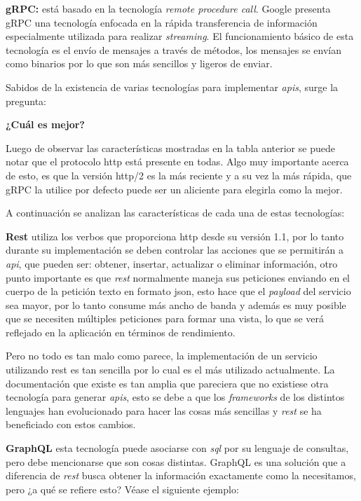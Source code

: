 \documentclass[12pt,spanish,Letterpaper,openany]{book}
\newcommand{\spacefourmilis}{\vspace{4mm}}
\newcommand{\spacetwomilis}{\vspace{2mm}}
\begin{document}

\textbf{gRPC:} está basado en la tecnología \emph{remote procedure call}. Google presenta gRPC una tecnología enfocada en la rápida transferencia de información especialmente utilizada para realizar \emph{streaming}. El funcionamiento básico de esta tecnología es el envío de mensajes a través de métodos, los mensajes se envían como binarios por lo que son más sencillos y ligeros de enviar.

Sabidos de la existencia de varias tecnologías para implementar \emph{apis}, surge la pregunta:

\textbf{¿Cuál es mejor?}

Luego de observar las características mostradas en la tabla anterior se puede notar que el protocolo http está presente en todas. Algo muy importante acerca de esto, es que la versión http/2 es la más reciente y a su vez la más rápida, que gRPC la utilice por defecto puede ser un aliciente para elegirla como la mejor.

A continuación se analizan las características de cada una de estas tecnologías:

\textbf{Rest} utiliza los verbos que proporciona http desde su versión 1.1, por lo tanto durante su implementación se deben controlar las acciones que se permitirán a \emph{api}, que pueden ser: obtener, insertar, actualizar o eliminar información, otro punto importante es que \emph{rest} normalmente maneja sus peticiones enviando en el cuerpo de la petición texto en formato json, esto hace que el \emph{payload} del servicio sea mayor, por lo tanto consume más ancho de banda y además es muy posible que se necesiten múltiples peticiones para formar una vista, lo que se verá reflejado en la aplicación en términos de rendimiento.

\spacetwomilis

Pero no todo es tan malo como parece, la implementación de un servicio utilizando rest es tan sencilla por lo cual es el más utilizado actualmente. La documentación que existe es tan amplia que pareciera que no existiese otra tecnología para generar \emph{apis}, esto se debe a que los \emph{frameworks} de los distintos lenguajes han evolucionado para hacer las cosas más sencillas y \emph{rest} se ha beneficiado con estos cambios.

\spacefourmilis

\textbf{GraphQL} esta tecnología puede asociarse con \emph{sql} por su lenguaje de consultas, pero debe mencionarse que son cosas distintas. GraphQL es una solución que a diferencia de \emph{rest} busca obtener la información exactamente como la necesitamos, pero ¿a qué se refiere esto? Véase el siguiente ejemplo:
\end{document}
